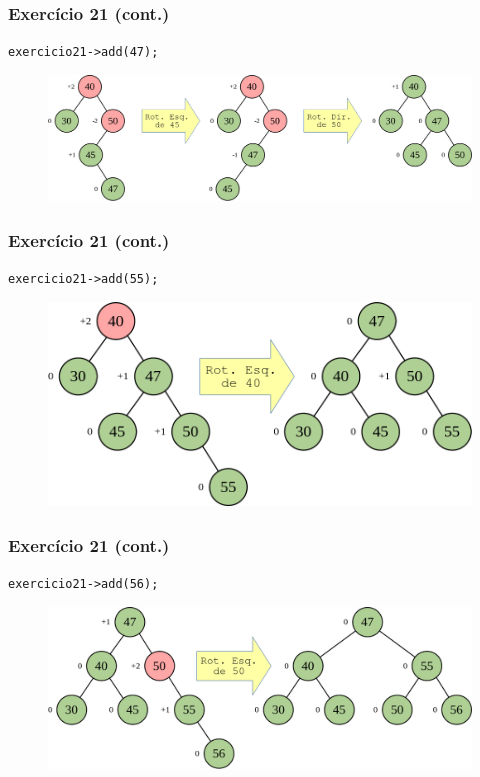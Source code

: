 \documentclass[aspectratio=169]{beamer}
\begin{document}
\begin{frame}[fragile]\frametitle{Exercício 21 (cont.)}
\texttt{exercicio21->add(47);}
\begin{figure}[h]
	\centering
	\includegraphics[height=0.35\paperheight]{imagens/avl-exercicio21e.png}
\end{figure}
\end{frame}

\begin{frame}[fragile]\frametitle{Exercício 21 (cont.)}
\texttt{exercicio21->add(55);}
\begin{figure}[h]
	\centering
	\includegraphics[height=0.35\paperheight]{imagens/avl-exercicio21f.png}
\end{figure}
\end{frame}

\begin{frame}[fragile]\frametitle{Exercício 21 (cont.)}
\texttt{exercicio21->add(56);}
\begin{figure}[h]
	\centering
	\includegraphics[height=0.35\paperheight]{imagens/avl-exercicio21g.png}
\end{figure}
\end{frame}
\end{document}
